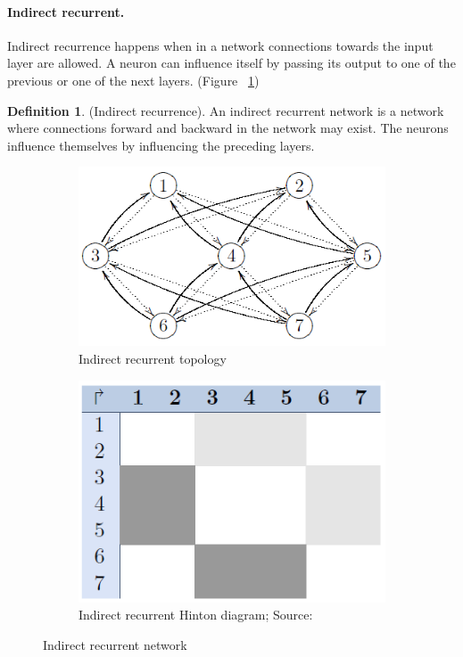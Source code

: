 \documentclass[pdftex,a4paper,12pt,twoside]{report}
\theoremstyle{plain} \newtheorem{theorem}{Theorem} \newtheorem{proposition}{Proposition} \newtheorem{lemma}{Lemma} \newtheorem*{corollary}{Corollary}
\theoremstyle{definition} \newtheorem{definition}{Definition} \newtheorem{conjecture}{Conjecture} \newtheorem*{example}{Example} \newtheorem{algorithm}{Algorithm}
\theoremstyle{remark} \newtheorem*{remark}{Remark} \newtheorem*{note}{Note} \newtheorem{case}{Case}
\begin{document}
\paragraph{Indirect recurrent.}
Indirect recurrence happens when in a network connections towards the input layer are allowed. A neuron can influence itself by passing its output to one of the previous or one of the next layers. (Figure ~\ref{fig:inderectrecurrence})
\begin{definition}
(Indirect recurrence). An indirect recurrent network is a network where connections forward and backward in the network may exist. The neurons influence themselves by influencing the preceding layers.
\end{definition}
\begin{figure}
\centering
	\begin{subfigure}[b]{0.3\textwidth}
	\centering
	\includegraphics[width=\textwidth]{./img/recurrent-indirect-Topology.png}
	\caption{Indirect recurrent topology}
	\end{subfigure}
	\begin{subfigure}[b]{0.3\textwidth}
	\centering
	\includegraphics[width=\textwidth]{./img/recurrent-indirect-Hinton.png}
	\caption{Indirect recurrent Hinton diagram; Source:\citep{Kriesel2013}}
	\end{subfigure}
\caption{Indirect recurrent network}
\label{fig:inderectrecurrence}
\end{figure}
\end{document}
